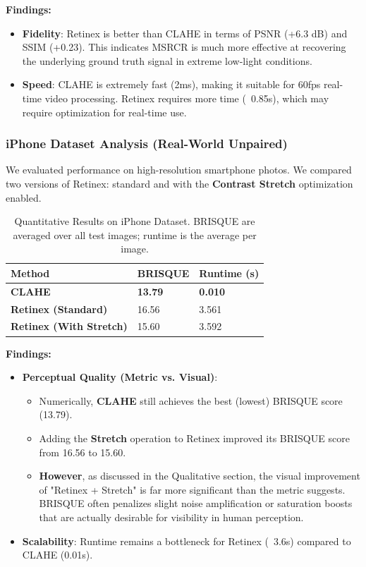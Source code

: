 \textbf{Findings:}
\begin{itemize}
    \item \textbf{Fidelity}: Retinex is better than CLAHE in terms of PSNR (+6.3 dB) and SSIM (+0.23). This indicates MSRCR is much more effective at recovering the underlying ground truth signal in extreme low-light conditions.
    \item \textbf{Speed}: CLAHE is extremely fast (2ms), making it suitable for 60fps real-time video processing. Retinex requires more time (~0.85s), which may require optimization for real-time use.
\end{itemize}

\subsubsection{iPhone Dataset Analysis (Real-World Unpaired)}
We evaluated performance on high-resolution smartphone photos. We compared two versions of Retinex: standard and with the \textbf{Contrast Stretch} optimization enabled.

\begin{table}[htbp]
\centering
\begin{tabular}{|l|l|l|}
\hline
Method & BRISQUE & Runtime (s) \\ \hline
\textbf{CLAHE} & \textbf{13.79} & \textbf{0.010} \\ \hline
\textbf{Retinex (Standard)} & 16.56 & 3.561 \\ \hline
\textbf{Retinex (With Stretch)} & 15.60 & 3.592 \\ \hline
\end{tabular}
\caption{Quantitative Results on iPhone Dataset. BRISQUE are averaged over all test images; runtime is the average per image.}
\end{table}

\textbf{Findings:}
\begin{itemize}
    \item \textbf{Perceptual Quality (Metric vs. Visual)}:
    \begin{itemize}
        \item Numerically, \textbf{CLAHE} still achieves the best (lowest) BRISQUE score (13.79).
        \item Adding the \textbf{Stretch} operation to Retinex improved its BRISQUE score from 16.56 to 15.60.
        \item \textbf{However}, as discussed in the Qualitative section, the visual improvement of "Retinex + Stretch" is far more significant than the metric suggests. BRISQUE often penalizes slight noise amplification or saturation boosts that are actually desirable for visibility in human perception.
    \end{itemize}
    \item \textbf{Scalability}: Runtime remains a bottleneck for Retinex (~3.6s) compared to CLAHE (0.01s).
\end{itemize}

